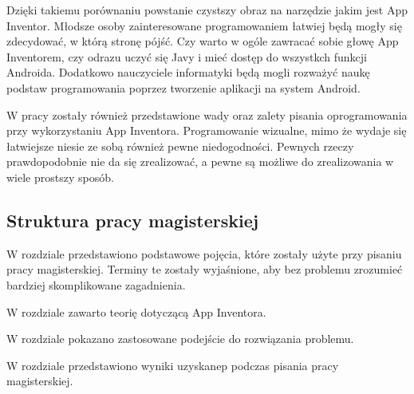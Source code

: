 Dzięki takiemu porównaniu powstanie czystszy obraz na narzędzie jakim jest App Inventor. Młodsze osoby zainteresowane programowaniem łatwiej będą mogły się zdecydować, w którą stronę pójść. Czy warto w ogóle zawracać sobie głowę App Inventorem, czy odrazu uczyć się Javy i mieć dostęp do wszystkch funkcji Androida. Dodatkowo nauczyciele informatyki będą mogli rozważyć naukę podstaw programowania poprzez tworzenie aplikacji na system Android.

W pracy zostały również przedstawione wady oraz zalety pisania oprogramowania przy wykorzystaniu App Inventora. Programowanie wizualne, mimo że wydaje się łatwiejsze niesie ze sobą również pewne niedogodności. Pewnych rzeczy prawdopodobnie nie da się zrealizować, a pewne są możliwe do zrealizowania w wiele prostszy sposób.


\subsection{Struktura pracy magisterskiej}

W rozdziale  przedstawiono podstawowe pojęcia, które zostały użyte przy pisaniu pracy magisterskiej. Terminy te zostały wyjaśnione, aby bez problemu zrozumieć bardziej skomplikowane zagadnienia.

W rozdziale  zawarto teorię dotyczącą App Inventora.

W rozdziale  pokazano zastosowane podejście do rozwiązania problemu.

W rozdziale  przedstawiono wyniki uzyskanep podczas pisania pracy magisterskiej.











